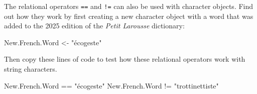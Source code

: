 \documentclass[
  letterpaper,
  DIV=11,
  numbers=noendperiod]{scrreprt}
\newenvironment{Shaded}{\begin{snugshade}}{\end{snugshade}}
\newcommand{\NormalTok}[1]{\textcolor[rgb]{0.00,0.23,0.31}{#1}}
\newcommand{\OtherTok}[1]{\textcolor[rgb]{0.00,0.23,0.31}{#1}}
\newcommand{\SpecialCharTok}[1]{\textcolor[rgb]{0.37,0.37,0.37}{#1}}
\newcommand{\StringTok}[1]{\textcolor[rgb]{0.13,0.47,0.30}{#1}}
\begin{document}
The relational operators \texttt{==} and \texttt{!=} can also be used
with character objects. Find out how they work by first creating a new
character object with a word that was added to the 2025 edition of the
\emph{Petit Larousse} dictionary:

\begin{Shaded}
\begin{Highlighting}[]
\NormalTok{New.French.Word }\OtherTok{\textless{}{-}} \StringTok{"écogeste"}
\end{Highlighting}
\end{Shaded}

Then copy these lines of code to test how these relational operators
work with string characters.

\begin{Shaded}
\begin{Highlighting}[]
\NormalTok{New.French.Word }\SpecialCharTok{==} \StringTok{"écogeste"} 
\NormalTok{New.French.Word }\SpecialCharTok{!=} \StringTok{"trottinettiste"}
\end{Highlighting}
\end{Shaded}
\end{document}
